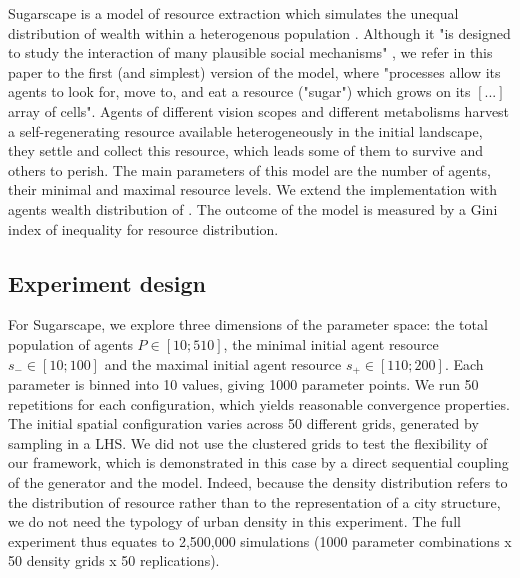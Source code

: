 \documentclass[preprint,5p,times,twocolumn,authoryear]{elsarticle}
\begin{document}
Sugarscape is a model of resource extraction which simulates the unequal distribution of wealth within a heterogenous population \cite{EpsteinAxtell1996}. Although it "is designed to study the interaction of many plausible social mechanisms" \cite[p.125]{Axtelletal1996}, we refer in this paper to the first (and simplest) version of the model, where "processes allow its agents to look for, move to, and eat a resource ("sugar") which grows on its $[...]$ array of cells". Agents of different vision scopes and different metabolisms harvest a self-regenerating resource available heterogeneously in the initial landscape, they settle and collect this resource, which leads some of them to survive and others to perish. The main parameters of this model are the number of agents, their minimal and maximal resource levels.  We extend the implementation with agents wealth distribution of \cite{li2009netlogo}. The outcome of the model is measured by a Gini index of inequality for resource distribution. 


\subsection{Experiment design}
For Sugarscape, we explore three dimensions of the parameter space: the total population of agents $P\in \left[10;510\right]$, the minimal initial agent resource $s_{-}\in \left[10;100\right]$ and the maximal initial agent resource $s_{+}\in \left[110;200\right]$. Each parameter is binned into 10 values, giving 1000 parameter points. We run 50 repetitions for each configuration, which yields reasonable convergence properties. The initial spatial configuration varies across 50 different grids, generated by sampling  in a LHS. We did not use the clustered grids to test the flexibility of our framework, which is demonstrated in this case by a direct sequential coupling of the generator and the model. Indeed, because the density distribution refers to the distribution of resource rather than to the representation of a city structure, we do not need the typology of urban density in this experiment. The full experiment thus equates to 2,500,000 simulations (1000 parameter combinations x 50 density grids x 50 replications). 
\end{document}
